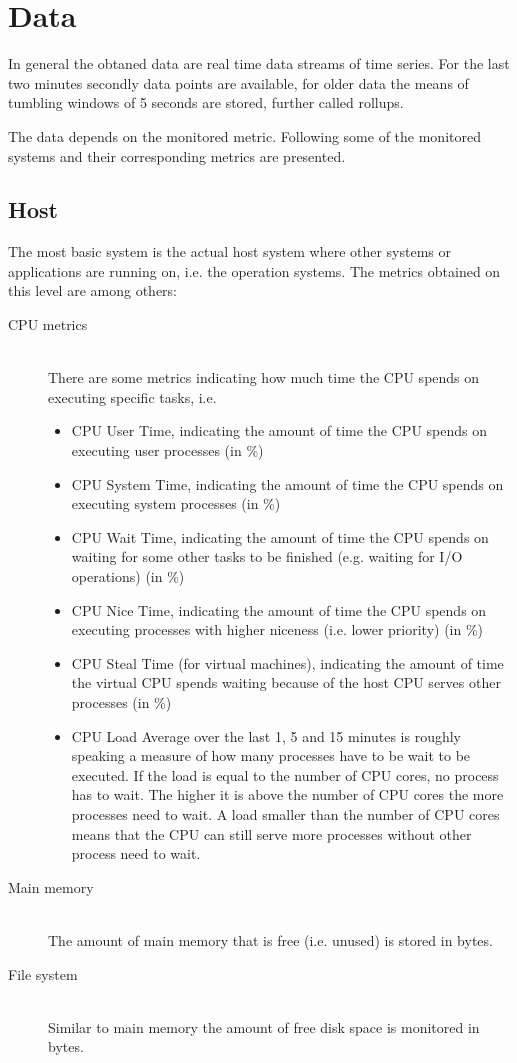 \documentclass[]{article}
\begin{document}
\section{Data}
In general the obtaned data are real time data streams of time series.
For the last two minutes secondly data points are available, for older data the means of tumbling windows of 5 seconds are stored, further called rollups.

The data depends on the monitored metric.
Following some of the monitored systems and their corresponding metrics are presented.

\subsection{Host}
The most basic system is the actual host system where other systems or applications are running on, i.e. the operation systems.
The metrics obtained on this level are among others:

\begin{description}
	\item[CPU metrics] \hfill \\
	There are some metrics indicating how much time the CPU spends on executing specific tasks, i.e.
	\begin{itemize}
		\item CPU User Time, indicating the amount of time the CPU spends on executing user processes (in \%)
		\item CPU System Time, indicating the amount of time the CPU spends on executing system processes (in \%)
		\item CPU Wait Time, indicating the amount of time the CPU spends on waiting for some other tasks to be finished (e.g. waiting for I/O operations) (in \%)
		\item CPU Nice Time, indicating the amount of time the CPU spends on executing processes with higher niceness (i.e. lower priority) (in \%)
		\item CPU Steal Time (for virtual machines), indicating the amount of time the virtual CPU spends waiting because of the host CPU serves other processes (in \%)
		\item CPU Load Average over the last 1, 5 and 15 minutes is roughly speaking a measure of how many processes have to be wait to be executed. If the load is equal to the number of CPU cores, no process has to wait. The higher it is above the number of CPU cores the more processes need to wait. A load smaller than the number of CPU cores means that the CPU can still serve more processes without other process need to wait.
	\end{itemize}
	
	\item[Main memory] \hfill \\
	The amount of main memory that is free (i.e. unused) is stored in bytes.
	
	\item[File system] \hfill\\
	Similar to main memory the amount of free disk space is monitored in bytes.
\end{description}
\end{document}
